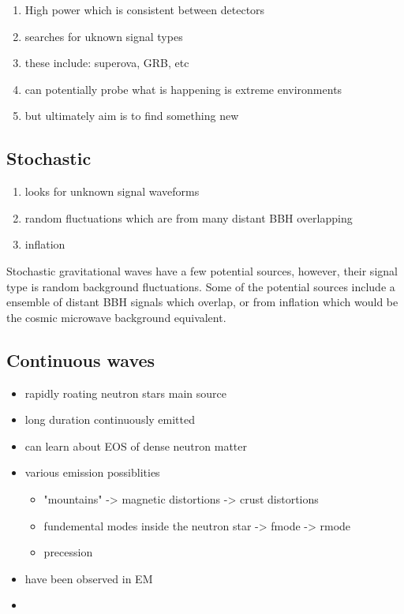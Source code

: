 \begin{enumerate}
    \item High power which is consistent between detectors
    \item searches for uknown signal types
    \item these include: superova, GRB, etc
    \item can potentially probe what is happening is extreme environments
    \item but ultimately aim is to find something new
\end{enumerate}


\subsection{Stochastic}

\begin{enumerate}
    \item looks for unknown signal waveforms
    \item random fluctuations which are from many distant BBH overlapping
    \item inflation
\end{enumerate}

Stochastic gravitational waves have a few potential sources, however, their signal type is random background fluctuations. 
Some of the potential sources include a ensemble of distant \ac{BBH} signals which overlap, or from inflation which would be the cosmic microwave background equivalent. 

\subsection{Continuous waves}

\begin{itemize}
    \item rapidly roating neutron stars main source
    \item long duration continuously emitted
    \item can learn about EOS of dense neutron matter
    \item various emission possiblities
    \begin{itemize}
        \item "mountains" -> magnetic distortions -> crust distortions
        \item fundemental modes inside the neutron star -> fmode -> rmode
        \item precession
    \end{itemize}
    \item have been observed in EM
    \item 
\end{itemize}


